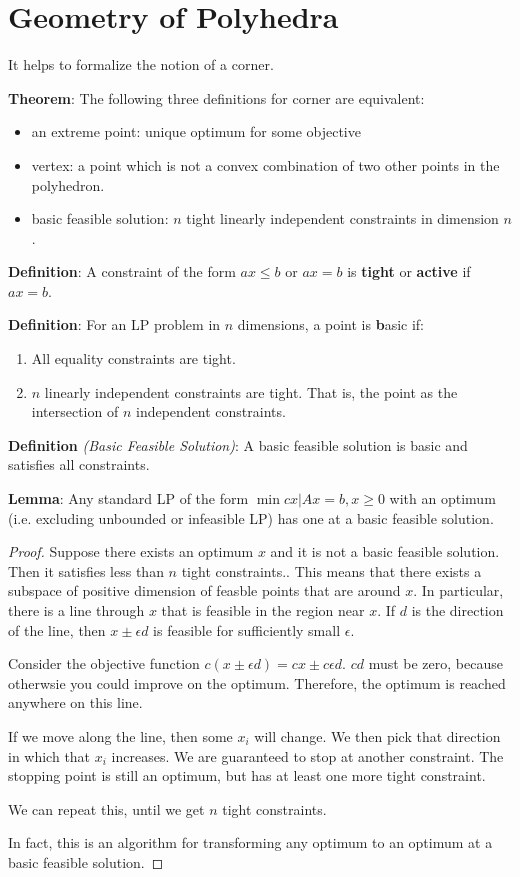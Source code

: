 \documentclass{article}
\begin{document}
\section{Geometry of Polyhedra}

It helps to formalize the notion of a corner.

\textbf{Theorem}:
The following three definitions for corner are equivalent:
\begin{itemize}
\item an extreme point: unique optimum for some objective
\item vertex: a point which is not a convex combination of two other points in the polyhedron.
\item basic feasible solution: $n$ tight linearly independent constraints in dimension $n$.
\end{itemize}

\textbf{Definition}:
A constraint of the form $ax \le b$ or $ax = b$ is {\bf tight} or {\bf active} if $ax = b$.

\textbf{Definition}:
For an LP problem in $n$ dimensions, a point is {\textbf basic} if:
\begin{enumerate}
\item All equality constraints are tight.
\item $n$ linearly independent constraints are tight. That is, the point as the intersection of $n$ independent constraints.
\end{enumerate}

\textbf{Definition} \emph{(Basic Feasible Solution)}:
A basic feasible solution is basic and satisfies all constraints.

\textbf{Lemma}:
Any standard LP of the form $\min cx | Ax=b, x \ge 0$ with an optimum
 (i.e. excluding unbounded or infeasible LP) has one at a basic feasible solution.
 
\begin{proof}
Suppose there exists an optimum $x$ and it is not a basic feasible solution.
Then it satisfies less than $n$ tight constraints.. This means that there exists a subspace of positive dimension of feasble points that are around $x$. In particular, there is a line through $x$ that is feasible in the region near $x$.  If $d$ is the direction of the line, then $x \pm \epsilon d$ is feasible for sufficiently small $\epsilon$.

Consider the objective function $c(x\pm \epsilon d) = cx \pm c\epsilon d$. $cd$ must be zero, because otherwsie you could improve on the optimum. Therefore, the optimum is reached anywhere on this line.

If we move along the line, then some $x_i$ will change. We then pick that direction in which that $x_i$ increases. We are guaranteed to stop at another constraint. The stopping point is still an optimum, but has at least one more tight constraint.

We can repeat this, until we get $n$ tight constraints.

In fact, this is an algorithm for transforming any optimum to an optimum at a basic feasible solution.

\end{proof}
\end{document}
